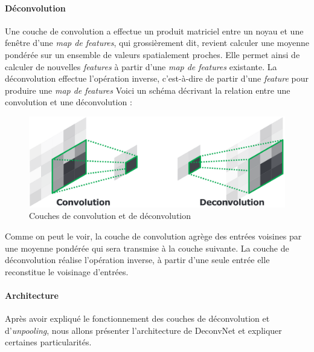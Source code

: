 \documentclass[a4paper, 11pt]{report}
\begin{document}
\paragraph{Déconvolution}
Une couche de convolution a effectue un produit matriciel entre un noyau et une fenêtre d'une \emph{map de  features}, qui grossièrement dit, revient calculer une moyenne pondérée sur un ensemble de valeurs spatialement proches.
Elle permet ainsi de calculer de nouvelles \emph{features} à partir d'une \emph{map de features} existante.
La déconvolution effectue l'opération inverse, c'est-à-dire de partir d'une \emph{feature} pour produire une \emph{map de features}
Voici un schéma décrivant la relation entre une convolution et une déconvolution :
\begin{figure}[H]
	\centering
	\includegraphics[scale=0.3]{Images/Deconvolution.png}
	\caption{Couches de convolution et de déconvolution}
\end{figure}
Comme on peut le voir, la couche de convolution agrège des entrées voisines par une moyenne pondérée qui sera transmise à la couche suivante.
La couche de déconvolution réalise l'opération inverse, à partir d'une seule entrée elle reconstitue le voisinage d'entrées.

\paragraph{Architecture}
Après avoir expliqué le fonctionnement des couches de déconvolution et d'\emph{unpooling}, nous allons présenter l'architecture de DeconvNet et expliquer certaines particularités.
\end{document}
